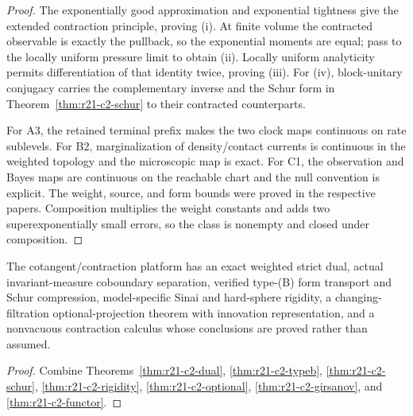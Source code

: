 \begin{proof}
The exponentially good approximation and exponential tightness give the
extended contraction principle, proving (i).  At finite volume the contracted
observable is exactly the pullback, so the exponential moments are equal;
pass to the locally uniform pressure limit to obtain (ii).  Locally uniform
analyticity permits differentiation of that identity twice, proving (iii).
For (iv), block-unitary conjugacy carries the complementary inverse and the
Schur form in Theorem~\ref{thm:r21-c2-schur} to their contracted counterparts.

For A3, the retained terminal prefix makes the two clock maps continuous on
rate sublevels.  For B2, marginalization of density/contact currents is
continuous in the weighted topology and the microscopic map is exact.  For
C1, the observation and Bayes maps are continuous on the reachable chart and
the null convention is explicit.  The weight, source, and form bounds were
proved in the respective papers.  Composition multiplies the weight constants
and adds two superexponentially small errors, so the class is nonempty and
closed under composition.
\end{proof}

\begin{theorem}
\label{thm:r21-c2-main}
The cotangent/contraction platform has an exact weighted strict dual, actual
invariant-measure coboundary separation, verified type-(B) form transport and
Schur compression, model-specific Sinai and hard-sphere rigidity, a
changing-filtration optional-projection theorem with innovation
representation, and a nonvacuous contraction calculus whose conclusions are
proved rather than assumed.
\end{theorem}

\begin{proof}
Combine Theorems~\ref{thm:r21-c2-dual},
\ref{thm:r21-c2-typeb}, \ref{thm:r21-c2-schur},
\ref{thm:r21-c2-rigidity}, \ref{thm:r21-c2-optional},
\ref{thm:r21-c2-girsanov}, and \ref{thm:r21-c2-functor}.
\end{proof}
